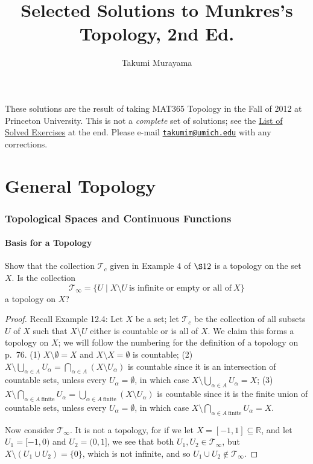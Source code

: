 \documentclass[12pt]{article}
\title{Selected Solutions to Munkres's Topology, 2nd Ed.}
\author{Takumi Murayama}
\theoremstyle{remark}
\begin{document}
\maketitle
These solutions are the result of taking MAT365 Topology in the Fall of 2012 at Princeton University. This is not a \emph{complete} set of solutions; see the \hyperlink{det.1}{List of Solved Exercises} at the end. Please e-mail \href{mailto:takumim@umich.edu}{\nolinkurl{takumim@umich.edu}} with any corrections.
\begingroup
\setlength{\cftsubsecnumwidth}{2.75em}
\endgroup
\newpage
\part{General Topology}
\setcounter{section}{1}
\section{Topological Spaces and Continuous Functions}
\setcounter{subsection}{12}
\subsection{Basis for a Topology}
\setcounter{subsubsection}{2}
\begin{problem}
  Show that the collection $\mathcal{T}_c$ given in Example $4$ of $\S12$ is a topology on the set $X$. Is the collection
  \begin{equation*}
    \mathcal{T}_\infty = \{U \mid X \setminus U~\text{is infinite or empty or all of}~X\}
  \end{equation*}
  a topology on $X$?
\end{problem}
\begin{proof}
  Recall Example 12.4: Let $X$ be a set; let $\mathcal{T}_c$ be the
  collection of all subsets $U$ of $X$ such that $X \setminus U$ either is
  countable or is all of $X$. We claim this forms a topology on $X$; we will
  follow the numbering for the definition of a topology on p.~76. (1) $X
  \setminus \emptyset = X$ and $X \setminus X = \emptyset$ is countable; (2)
  $X \setminus \bigcup_{\alpha \in A} U_\alpha = \bigcap_{\alpha \in A} (X
  \setminus U_\alpha)$ is countable since it is an intersection of countable sets,
  unless every $U_\alpha = \emptyset$, in which case $X \setminus \bigcup_{\alpha \in
  A} U_\alpha = X$; (3) $X \setminus \bigcap_{\alpha \in A~\text{finite}}
  U_\alpha = \bigcup_{\alpha \in A~\text{finite}} (X \setminus U_\alpha)$ is
  countable since it is the finite union of countable sets, unless every
  $U_\alpha = \emptyset$, in which case $X \setminus
  \bigcap_{\alpha \in A~\text{finite}} U_\alpha = X$.
  \par Now consider $\mathcal{T}_\infty$. It is not a topology, for if we let $X = [-1,1] \subseteq \mathbb{R}$, and let $U_1 = [-1,0)$ and $U_2 = (0,1]$, we see that both $U_1,U_2 \in \mathcal{T}_\infty$, but $X \setminus (U_1 \cup U_2) = \{0\}$, which is not infinite, and so $U_1 \cup U_2 \notin \mathcal{T}_\infty$.
\end{proof}
\end{document}

